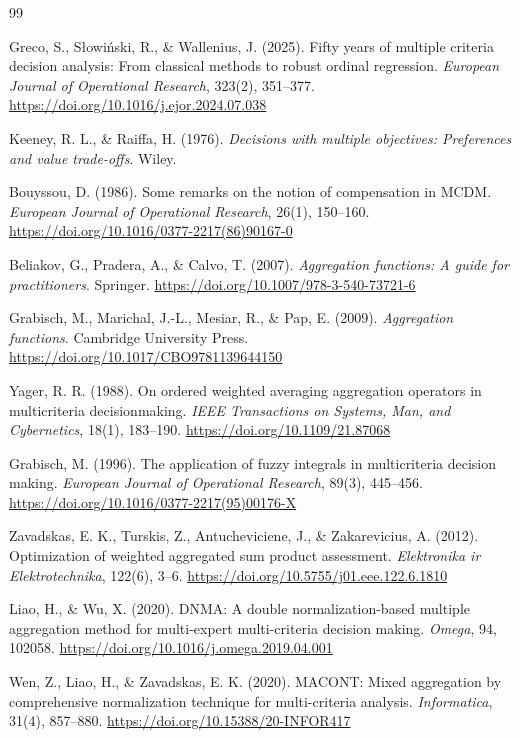 \documentclass[reqno,11pt]{amsart}
\theoremstyle{definition}
\theoremstyle{plain}
\theoremstyle{remark}
\begin{document}
\begin{thebibliography}{99}

Greco, S., S\l{}owi\'nski, R., \& Wallenius, J. (2025). Fifty years of multiple criteria decision analysis: From classical methods to robust ordinal regression. \emph{European Journal of Operational Research}, 323(2), 351--377. \url{https://doi.org/10.1016/j.ejor.2024.07.038}

Keeney, R. L., \& Raiffa, H. (1976). \emph{Decisions with multiple objectives: Preferences and value trade-offs}. Wiley.

Bouyssou, D. (1986). Some remarks on the notion of compensation in MCDM. \emph{European Journal of Operational Research}, 26(1), 150--160. \url{https://doi.org/10.1016/0377-2217(86)90167-0}

Beliakov, G., Pradera, A., \& Calvo, T. (2007). \emph{Aggregation functions: A guide for practitioners}. Springer. \url{https://doi.org/10.1007/978-3-540-73721-6}

Grabisch, M., Marichal, J.-L., Mesiar, R., \& Pap, E. (2009). \emph{Aggregation functions}. Cambridge University Press. \url{https://doi.org/10.1017/CBO9781139644150}

Yager, R. R. (1988). On ordered weighted averaging aggregation operators in multicriteria decisionmaking. \emph{IEEE Transactions on Systems, Man, and Cybernetics}, 18(1), 183--190. \url{https://doi.org/10.1109/21.87068}

Grabisch, M. (1996). The application of fuzzy integrals in multicriteria decision making. \emph{European Journal of Operational Research}, 89(3), 445--456. \url{https://doi.org/10.1016/0377-2217(95)00176-X}

Zavadskas, E. K., Turskis, Z., Antucheviciene, J., \& Zakarevicius, A. (2012). Optimization of weighted aggregated sum product assessment. \emph{Elektronika ir Elektrotechnika}, 122(6), 3--6. \url{https://doi.org/10.5755/j01.eee.122.6.1810}

Liao, H., \& Wu, X. (2020). DNMA: A double normalization-based multiple aggregation method for multi-expert multi-criteria decision making. \emph{Omega}, 94, 102058. \url{https://doi.org/10.1016/j.omega.2019.04.001}

Wen, Z., Liao, H., \& Zavadskas, E. K. (2020). MACONT: Mixed aggregation by comprehensive normalization technique for multi-criteria analysis. \emph{Informatica}, 31(4), 857--880. \url{https://doi.org/10.15388/20-INFOR417}


\end{thebibliography}
\end{document}
